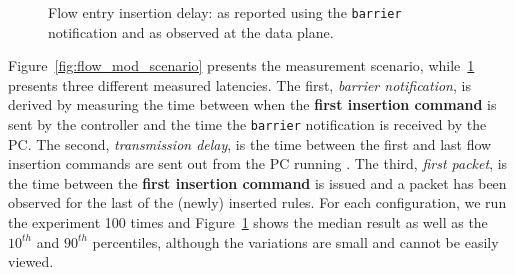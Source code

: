 \begin{figure}[ht]
  \begin{center}
  \end{center}
  \caption{Flow entry insertion delay: as reported using the
    \texttt{barrier} notification and as observed at the data
    plane.}
  \label{fig:flow_insertion_comparison}
\end{figure}


Figure~\ref{fig:flow_mod_scenario} presents the measurement scenario,
while~\ref{fig:flow_insertion_comparison} presents three different measured
latencies.  The first, {\it barrier notification}, is derived by measuring the
time between when the \textbf{first insertion command} is sent by the \oflops
controller and the time the \texttt{barrier} notification is received by the
PC\@. The second, {\it transmission delay}, is the time between the first and
last flow insertion commands are sent out from the PC running \oflops.  The
third, {\it first packet}, is the time between the \textbf{first insertion
  command} is issued and a packet has been observed for the last of the (newly)
inserted rules. For each configuration, we run the experiment 100 times and
Figure~\ref{fig:flow_insertion_comparison} shows the median result as well as
the $10^{th}$ and $90^{th}$ percentiles, although the variations are small and
cannot be easily viewed.


